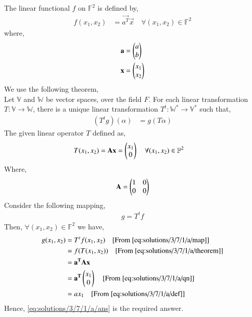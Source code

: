 The linear functional $f$ on $\mathbb{F}^2$ is defined by,
\begin{align}
f(x_1,x_2) &= \vec{a^T}\vec{x}
\quad{\text{$\forall (x_1,x_2) \in \mathbb{F}^2$}}\label{eq:solutions/3/7/1/a/def}
\end{align}
where,
\begin{align}
\mathbf{a} &= \begin{pmatrix}a\\b\end{pmatrix}\\
\mathbf{x} &= \begin{pmatrix}x_1\\x_2\end{pmatrix}
\end{align}
We use the following theorem,\\
Let $\mathbb{V}$ and $\mathbb{W}$ be vector spaces, over the field $F$. For each linear transformation $T: \mathbb{V} \xrightarrow{} \mathbb{W}$, there is a unique linear transformation $T^t: \mathbb{W}^* \xrightarrow{} \mathbb{V}^*$ such that,
\begin{align}
(T^tg)(\alpha) &= g(T\alpha)\label{eq:solutions/3/7/1/a/theorem}
\end{align}
The given linear operator $T$ defined as,
\begin{align}
T(x_1,x_2) &= \mathbf{A}\mathbf{x} = \begin{pmatrix}x_1\\0\end{pmatrix} \quad{\text{$\forall (x_1,x_2) \in \mathbb{F}^2$}}\label{eq:solutions/3/7/1/a/qn}
\end{align}
Where,
\begin{align}
\mathbf{A} &= \begin{pmatrix}1&0\\0&0\end{pmatrix}\\
\end{align}
Consider the following mapping,
\begin{align}
g = T^tf\label{eq:solutions/3/7/1/a/map}
\end{align}
Then, $\forall (x_1,x_2) \in \mathbb{F}^2$ we have,
\begin{align}
g(x_1,x_2) &= T^tf(x_1,x_2) \quad{\text{[From \eqref{eq:solutions/3/7/1/a/map}]}}\\
&= f(T(x_1,x_2)) \quad{\text{[From \eqref{eq:solutions/3/7/1/a/theorem}]}}\\
&= \mathbf{a^T}\mathbf{A}\mathbf{x}\\
&= \mathbf{a^T}\begin{pmatrix}x_1\\0\end{pmatrix} \quad{\text{[From \eqref{eq:solutions/3/7/1/a/qn}]}}\\
&= ax_1 \quad{\text{[From \eqref{eq:solutions/3/7/1/a/def}]}}\label{eq:solutions/3/7/1/a/ans}
\end{align}
Hence, \eqref{eq:solutions/3/7/1/a/ans} is the required answer.
